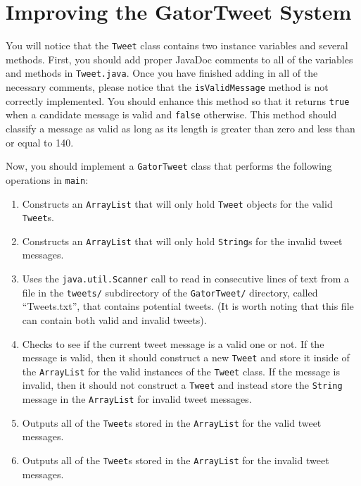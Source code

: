 \section*{Improving the GatorTweet System}

You will notice that the {\tt Tweet} class contains two instance variables and several methods.  First, you should add proper
JavaDoc comments to all of the variables and methods in {\tt Tweet.java}.  Once you have finished adding in all of the necessary
comments, please notice that the {\tt isValidMessage} method is not correctly implemented.  You should enhance this method so that
it returns {\tt true} when a candidate message is valid and {\tt false} otherwise.  This method should classify a message as valid
as long as its length is greater than zero and less than or equal to 140.


Now, you should implement a {\tt GatorTweet} class that performs the following operations in {\tt main}:

\vspace*{-.1in}
\begin{enumerate}
  \item Constructs an {\tt ArrayList} that will only hold {\tt Tweet} objects for the valid {\tt Tweet}s.
  
  \item Constructs an {\tt ArrayList} that will only hold {\tt String}s for the invalid tweet messages.
  
  \item Uses the {\tt java.util.Scanner} call to read in consecutive lines of text from a file in the {\tt tweets/} subdirectory of
    the {\tt GatorTweet/} directory, called ``Tweets.txt'', that contains potential tweets. (It is worth noting that this file can
    contain both valid and invalid tweets).
  
  \item Checks to see if the current tweet message is a valid one or not.  If the message is valid, then it should construct a new
    {\tt Tweet} and store it inside of the {\tt ArrayList} for the valid instances of the {\tt Tweet} class.  If the message is
    invalid, then it should not construct a {\tt Tweet} and instead store the {\tt String} message in the {\tt ArrayList} for
    invalid tweet messages.

  \item Outputs all of the {\tt Tweet}s stored in the {\tt ArrayList} for the valid tweet messages. 

  \item Outputs all of the {\tt Tweet}s stored in the {\tt ArrayList} for the invalid tweet messages. 

\end{enumerate}

